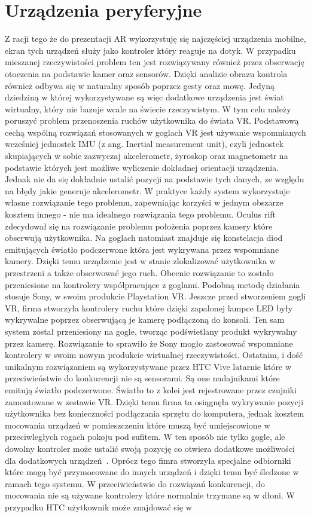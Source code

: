 \section{Urządzenia peryferyjne}
\label{sec:iot}
Z racji tego że do prezentacji AR wykorzystuję się najczęściej urządzenia mobilne, ekran tych urządzeń służy jako kontroler który reaguje na dotyk. W przypadku mieszanej rzeczywistości problem ten jest rozwiązywany również przez obserwację otoczenia na podstawie kamer oraz sensorów. Dzięki analizie obrazu kontrola również odbywa się w naturalny sposób poprzez gesty oraz mowę. Jedyną dziedziną w której wykorzystywane są więc dodatkowe urządzenia jest świat wirtualny, który nie bazuje wcale na świecie rzeczywistym. W tym celu należy poruszyć problem przenoszenia ruchów użytkownika do świata VR. 
Podstawową cechą wspólną rozwiązań stosowanych w goglach VR jest używanie wspomnianych wcześniej jednostek IMU (z ang. Inertial measurement unit), czyli jednostek skupiających w sobie zazwyczaj akcelerometr, żyroskop oraz magnetometr na podstawie których jest możliwe wyliczenie dokładnej orientacji urządzenia. Jednak nie da się dokładnie ustalić pozycji na podstawie tych danych, ze względu na błędy jakie generuje akcelerometr. W praktyce każdy system wykorzystuje własne rozwiązanie tego problemu, zapewniając korzyści w jednym obszarze kosztem innego - nie ma idealnego rozwiązania tego problemu. Oculus rift zdecydował się na rozwiązanie problemu położenia poprzez kamery które obserwują użytkownika. Na goglach natomiast znajduje się konstelacja diod emitujących światło podczerwone która jest wykrywana przez wspomniane kamery. Dzięki temu urządzenie jest w stanie zlokalizować użytkownika w przestrzeni a także obserwować jego ruch. Obecnie rozwiązanie to zostało przeniesione na kontrolery współpracujące z goglami. Podobną metodę działania stosuje Sony, w swoim produkcie Playstation VR. Jeszcze przed stworzeniem gogli VR, firma stworzyła kontrolery ruchu które dzięki zapalonej lampce LED były wykrywalne poprzez obserwującą je kamerę podłączoną do konsoli. Ten sam system został przeniesiony  na gogle, tworząc podświetlany produkt wykrywalny przez kamerę. Rozwiązanie to sprawiło że Sony mogło zastosować wspomniane kontrolery w swoim nowym produkcie wirtualnej rzeczywistości. Ostatnim, i dość unikalnym rozwiązaniem są wykorzystywane przez HTC Vive latarnie które w przeciwieństwie do konkurencji nie są sensorami. Są one nadajnikami które emitują światło podczerwone. Światło to z kolei jest rejestrowane przez czujniki zamontowane w zestawie VR. Dzięki temu firma ta osiągnęła wykrywanie pozycji użytkownika bez konieczności podłączania sprzętu do komputera, jednak kosztem mocowania urządzeń w pomieszczeniu które muszą być umiejscowione w przeciwległych rogach pokoju pod sufitem. W ten sposób nie tylko gogle, ale dowolny kontroler może ustalić swoją pozycję co otwiera dodatkowe możliwości dla dodatkowych urządzeń~\cite{sledzenie}. Oprócz tego fimra stworzyła specjalne odbiorniki które mogą być przymocowane do innych urządzeń i dzięki temu być śledzone w ramach tego systemu. W przeciwieństwie do rozwiązań konkurencji, do mocowania nie są używane kontrolery które normalnie trzymane są w dłoni. W przypadku HTC użytkownik może znajdować się w 
